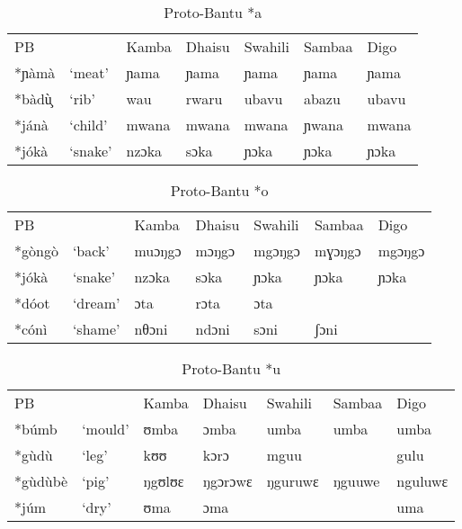 \documentclass[output=paper,colorlinks,citecolor=brown]{langscibook}
\begin{document}
\begin{table}
    \caption{Proto-Bantu *a}
    \label{tab:ngonyani:9}
    \begin{tabular}{@{}p{1cm} p{1.3cm} p{1.3cm} p{1.3cm} p{1.3cm} p{1.3cm} p{1.3cm}@{}}
        PB & & Kamba & Dhaisu & Swahili & Sambaa & Digo \\
        *ɲàmà & `meat' & ɲama & ɲama   &ɲama  & ɲama  & ɲama  \\
        *bàdù̧  & `rib' & wau & rwaru  & ubavu & abazu & ubavu\\
        *jánà & `child' & mwana & mwana & mwana & ɲwana &  mwana\\
        *jókà & `snake' & nzɔka & sɔka & ɲɔka & ɲɔka &  ɲɔka\\
    \end{tabular}
\end{table}

\begin{table}
    \caption{Proto-Bantu *o}
    \label{tab:ngonyani:10}
    \begin{tabular}{@{}p{1cm} p{1.3cm} p{1.3cm} p{1.3cm} p{1.3cm} p{1.3cm} p{1.3cm}@{}}
        PB & & Kamba & Dhaisu & Swahili & Sambaa & Digo \\
        *gòngò & `back' & muɔŋgɔ & mɔŋgɔ  & mgɔŋgɔ & mɣɔŋgɔ  & mgɔŋgɔ\\
        *jókà & `snake' & nzɔka & sɔka & ɲɔka & ɲɔka & ɲɔka \\
        *dóot & `dream' & ɔta & rɔta & ɔta & & \\
        *cónì & `shame' & nθɔni & ndɔni & sɔni & ʃɔni &  \\
    \end{tabular}
\end{table}

\begin{table}
    \caption{Proto-Bantu *u}
    \label{tab:ngonyani:11}
    \begin{tabular}{@{}p{1cm} p{1.3cm} p{1.3cm} p{1.3cm} p{1.3cm} p{1.3cm} p{1.3cm}@{}}
        PB & & Kamba & Dhaisu & Swahili & Sambaa & Digo \\
        *búmb & `mould' & ʊmba & ɔmba  & umba &  umba & umba\\
        *gùdù  & `leg' & kʊʊ & kɔrɔ & mguu & & gulu\\
        *gùdùbè & `pig' & ŋgʊlʊɛ & ŋgɔrɔwɛ & ŋguruwɛ & ŋguuwe & nguluwɛ\\
        *júm & `dry' & ʊma & ɔma &  &  & uma\\
    \end{tabular}
\end{table}
\end{document}
